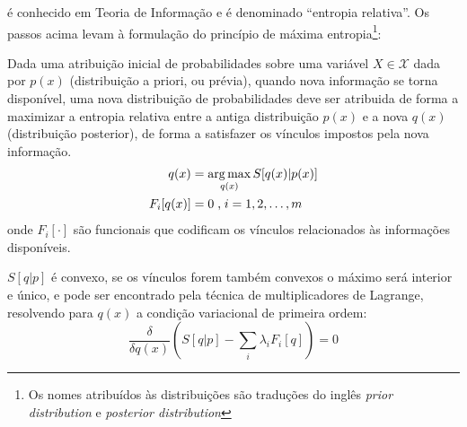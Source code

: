  é conhecido em Teoria de Informação\cite{Cover2006} e é denominado ``entropia relativa''. Os passos acima levam à formulação do princípio de máxima entropia\footnote{Os nomes atribuídos às distribuições são traduções do inglês \textit{prior distribution} e {\it posterior distribution}}:

\begin{Principio}
  Dada uma atribuição inicial de probabilidades sobre uma variável $X \in \mathcal{X}$ dada por $p(x)$ (distribuição a priori, ou prévia), quando nova informação se torna disponível, uma nova distribuição de probabilidades deve ser atribuida de forma a maximizar a entropia relativa entre a antiga distribuição $p(x)$  e a nova $q(x)$ (distribuição  posterior), de forma a satisfazer os vínculos impostos pela nova informação.
  \begin{align}
    q(x) &= \operatorname*{arg\,max}_{q(x)} S[q(x)|p(x)] \\
    F_i[q(x)] &= 0 \;\text{,}\;i = 1,2,\ldots,m
  \end{align}
  onde $F_i[\cdot]$ são funcionais que codificam os vínculos relacionados às informações disponíveis.
\end{Principio}

 $S[q | p]$ é convexo, se os vínculos forem também convexos o máximo será interior e único, e pode ser encontrado pela técnica de multiplicadores de Lagrange, resolvendo para $q(x)$ a condição variacional de primeira ordem:
\begin{equation}
\label{eq:entropymaximization}
\frac{\delta }{\delta q(x)}\left( S[q|p] - \sum_{i} \lambda_i F_i[q]\right) = 0
\end{equation}

